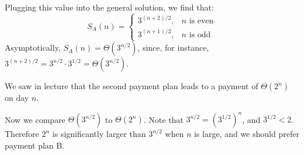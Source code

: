\begin{prob}
\begin{soln}
        Plugging this value into the general solution, we find that:
        \[
            S_A(n) = 
            \begin{cases}
                3^{(n+2)/2},& n \text{ is even}\\
                3^{(n+1)/2},& n \text{ is odd}
            \end{cases}
        \]
        Asymptotically, $S_A(n) = \Theta(3^{n/2})$, since, for instance,
        $3^{(n+2)/2} = 3^{n/2} \cdot 3^{1/2} = \Theta(3^{n/2})$.

        We saw in lecture that the second payment plan leads to a payment of $\Theta(2^n)$
        on day $n$.

        Now we compare $\Theta(3^{n/2})$ to $\Theta(2^n)$. Note that $3^{n/2} =
        \left(3^{1/2}\right)^n$, and $3^{1/2} < 2$. Therefore $2^n$ is
        significantly larger than $3^{n/2}$ when $n$ is large, and we should
        prefer payment plan B.
    \end{soln}
\end{prob}
